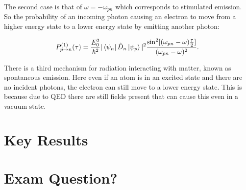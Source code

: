 \noindent The second case is that of $\omega = -\omega_{pn}$ which corresponds to stimulated emission. So the probability of an incoming photon causing an electron to move from a higher energy state to a lower energy state by emitting another photon:

\begin{equation}
    P^{(1)}_{p\rightarrow n}(\tau) = \frac{E_0^2}{\hbar^2} |\bra{\psi_n} \Hat{D}_n \ket{\psi_p}|^2 \frac{\sin^2[(\omega_{pn} - \omega)\frac{\tau}{2}]}{(\omega_{pn} - \omega)^2}.
    \label{StimulatedEmission}
\end{equation}

There is a third mechanism for radiation interacting with matter, known as spontaneous emission. Here even if an atom is in an excited state and there are no incident photons, the electron can still move to a lower energy state. This is because due to QED there are still fields present that can cause this even in a vacuum state.

\section{Key Results}

\section{Exam Question?}

